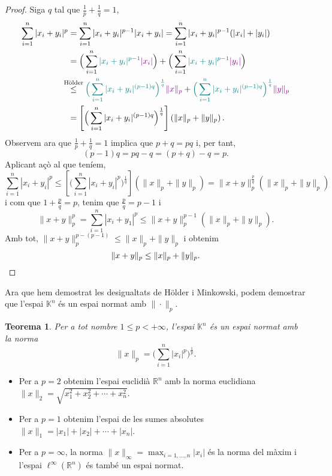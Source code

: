 \documentclass[12pt]{book}
\newtheorem{teorema}{Teorema}[chapter]
\theoremstyle{definition}
\theoremstyle{nota}
\theoremstyle{exemple}
\begin{document}
\begin{proof}
  Siga $q$ tal que $\frac{1}{p}+\frac{1}{q} = 1$,
  \begin{align*}
    \sum_{i=1}^{n} |x_i + y_i|^p
    &= \sum_{i=1}^{n} |x_i + y_i|^{p-1} |x_i + y_i|
      = \sum_{i=1}^{n} |x_i + y_i|^{p-1}(|x_i| + |y_i|) \\
    &= \Big( \sum_{i=1}^{n}
      \textcolor{teal}{|x_i+y_i|^{p-1}} \textcolor{violet}{|x_i|} \Big) +
      \Big( \sum_{i=1}^{n}
      \textcolor{teal}{|x_i+y_i|^{p-1}} \textcolor{violet}{|y_i|} \Big) \\
    &\overset{\mathclap{\text{Hölder}}}{\leq} \;\;\,
      \textcolor{teal}{\Big(\sum_{i=1}^{n} |x_i+y_i|^{(p-1)q}\Big)^{\frac{1}{q}}}
      \textcolor{violet}{\|x\|_p} +
      \textcolor{teal}{\Big(\sum_{i=1}^{n} |x_i+y_i|^{(p-1)q}\Big)^{\frac{1}{q}}}
      \textcolor{violet}{\|y\|_p} \\
    &= \left[\Big(\sum_{i=1}^{n} |x_i+y_i|^{(p-1)q}\Big)^{\frac{1}{q}}\right]
      \left( \|x\|_p + \|y\|_p \right).
  \end{align*}
  Observem ara que $\frac{1}{p} + \frac{1}{q} = 1$ implica que
  $p+q = pq$ i, per tant,
  \[
    (p-1)q = pq - q = (p+q) - q = p.
  \]
  Aplicant açò al que teníem,
  \[
    \sum_{i=1}^{n} |x_i + y_i|^p \leq \left[ \Big( \sum_{i=1}^{n}
      |x_i+y_i|^{p} \Big)^{\frac{1}{q}} \right] \left( \|x\|_p +
      \|y\|_p \right) = \|x + y\|_p^{\frac{p}{q}} \left( \|x\|_p +
      \|y\|_p \right)
  \]
  i com que $1 + \frac{p}{q} = p$, tenim que $\frac{p}{q} = p-1$ i
  \[
    \|x + y\|_p^p = \sum_{i=1}^{n} |x_i+y_1|^p \leq \|x+y\|_p^{p-1}
    (\|x\|_p+\|y\|_p).
  \]
  Amb tot, $\|x+y\|_p^{p-(p-1)} \leq \|x\|_p + \|y\|_p$ i obtenim
  \[
    \|x+y\|_p \leq \|x\|_p + \|y\|_p. \qedhere
  \]
\end{proof}

Ara que hem demostrat les desigualtats de Hölder i Minkowski, podem
demostrar que l'espai $\mathbb{K}^n$ és un espai normat amb
$\|\cdot\|_p$.

\begin{teorema}
  Per a tot nombre $1 \leq p < + \infty$, l'espai $\mathbb{K}^n$ és un
  espai normat amb la norma
  \[
    \|x\|_p = \Big( \sum_{i=1}^{n} |x_i|^p \Big)^{\frac{1}{p}}.
  \]
\end{teorema}

\begin{itemize}
\item Per a $p = 2$ obtenim l'espai euclidià $\mathbb{R}^n$ amb la
  norma euclidiana $\|x\|_2 = \sqrt{x_1^2 + x_2^2 + \dotsb + x_n^2}$.
\item Per a $p = 1$ obtenim l'espai de les sumes absolutes
  $\|x\|_1 = |x_1| + |x_2| + \dotsb + |x_n|$.
\item Per a $p = \infty$, la norma
  $\|x\|_\infty = \max_{i=1,\dotsc,n}|x_i|$ és la norma del màxim i
  l'espai $\ell^\infty(\mathbb{R}^n)$ és també un espai normat.
\end{itemize}
\end{document}
